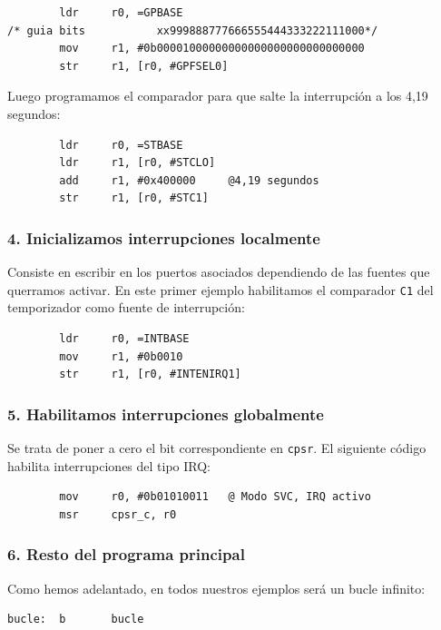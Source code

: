 \begin{lstlisting}
        ldr     r0, =GPBASE
/* guia bits           xx999888777666555444333222111000*/
        mov     r1, #0b00001000000000000000000000000000
        str     r1, [r0, #GPFSEL0]
\end{lstlisting}

Luego programamos el comparador para que salte la interrupción a los 4,19 segundos:

\begin{lstlisting}
        ldr     r0, =STBASE
        ldr     r1, [r0, #STCLO]
        add     r1, #0x400000     @4,19 segundos
        str     r1, [r0, #STC1]
\end{lstlisting}

\subsubsection{4. Inicializamos interrupciones localmente}

Consiste en escribir en los puertos asociados dependiendo de las fuentes que querramos
activar. En este primer ejemplo habilitamos el comparador
{\tt C1} del temporizador como fuente de interrupción:

\begin{lstlisting}
        ldr     r0, =INTBASE
        mov     r1, #0b0010
        str     r1, [r0, #INTENIRQ1]
\end{lstlisting}

\subsubsection{5. Habilitamos interrupciones globalmente}

Se trata de poner a cero el bit correspondiente en {\tt cpsr}. El siguiente código habilita
interrupciones del tipo IRQ:

\begin{lstlisting}
        mov     r0, #0b01010011   @ Modo SVC, IRQ activo
        msr     cpsr_c, r0
\end{lstlisting}

\subsubsection{6. Resto del programa principal}

Como hemos adelantado, en todos nuestros ejemplos será un bucle infinito:

\begin{lstlisting}
bucle:  b       bucle
\end{lstlisting}

